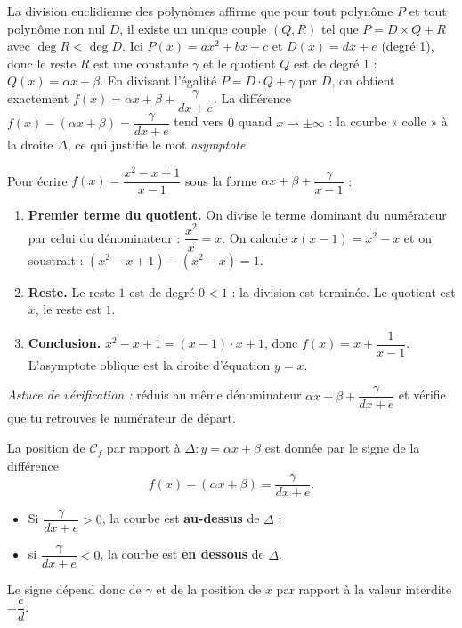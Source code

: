 \documentclass[11pt]{article}
\begin{document}
\begin{experience}
La division euclidienne des polynômes affirme que pour tout polynôme $P$ et tout polynôme non nul $D$, il existe un unique couple $(Q,R)$ tel que $P=D\times Q+R$ avec $\deg R<\deg D$. Ici $P(x)=ax^2+bx+c$ et $D(x)=dx+e$ (degré 1), donc le reste $R$ est une constante $\gamma$ et le quotient $Q$ est de degré 1 : $Q(x)=\alpha x+\beta$. En divisant l'égalité $P=D\cdot Q+\gamma$ par $D$, on obtient exactement $f(x)=\alpha x+\beta+\dfrac{\gamma}{dx+e}$. La différence $f(x)-(\alpha x+\beta)=\dfrac{\gamma}{dx+e}$ tend vers $0$ quand $x\to\pm\infty$ : la courbe « colle » à la droite $\Delta$, ce qui justifie le mot \emph{asymptote}.
\end{experience}

\begin{methode}
Pour écrire $f(x)=\dfrac{x^2-x+1}{x-1}$ sous la forme $\alpha x+\beta+\dfrac{\gamma}{x-1}$ :
\begin{enumerate}
\item \textbf{Premier terme du quotient.} On divise le terme dominant du numérateur par celui du dénominateur : $\dfrac{x^2}{x}=x$. On calcule $x(x-1)=x^2-x$ et on soustrait : $(x^2-x+1)-(x^2-x)=1$.
\item \textbf{Reste.} Le reste $1$ est de degré $0<1$ : la division est terminée. Le quotient est $x$, le reste est $1$.
\item \textbf{Conclusion.} $x^2-x+1=(x-1)\cdot x+1$, donc $f(x)=x+\dfrac{1}{x-1}$. L'asymptote oblique est la droite d'équation $y=x$.
\end{enumerate}
\emph{Astuce de vérification :} réduis au même dénominateur $\alpha x+\beta+\dfrac{\gamma}{dx+e}$ et vérifie que tu retrouves le numérateur de départ.
\end{methode}

\begin{propriete}
La position de $\mathcal{C}_f$ par rapport à $\Delta : y=\alpha x+\beta$ est donnée par le signe de la différence
\[ f(x)-(\alpha x+\beta)=\dfrac{\gamma}{dx+e}. \]
\begin{itemize}
\item Si $\dfrac{\gamma}{dx+e}>0$, la courbe est \textbf{au-dessus} de $\Delta$ ;
\item si $\dfrac{\gamma}{dx+e}<0$, la courbe est \textbf{en dessous} de $\Delta$.
\end{itemize}
Le signe dépend donc de $\gamma$ et de la position de $x$ par rapport à la valeur interdite $-\dfrac{e}{d}$.
\end{propriete}
\end{document}
